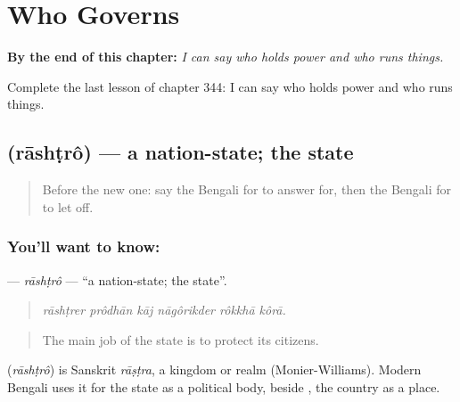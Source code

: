 
\chapter{Who Governs}
\label{ch:bn-who-governs}

\begin{chapteropening}
\textbf{By the end of this chapter:} \emph{I can say who holds power and who runs things.}

Complete the last lesson of chapter 344: I can say who holds power and who runs things.
\end{chapteropening}

\section[\texorpdfstring{\bn{রাষ্ট্র} (rāshṭrô)}{রাষ্ট্র (rāshṭrô)}]{ (rāshṭrô) — a nation-state; the state}

\label{lesson:BN-C344-rashtro}



\begin{quote}
Before the new one: say the Bengali for to answer for, then the Bengali for to let off.
\end{quote}

\subsection*{You'll want to know: }
\textbf{} — \emph{rāshṭrô} — \textquotedblleft{}a nation-state; the state\textquotedblright{}.

\begin{quote}
     
\end{quote}

\begin{quote}
\emph{rāshṭrer prôdhān kāj nāgôrikder rôkkhā kôrā.}
\end{quote}

\begin{quote}
The main job of the state is to protect its citizens.
\end{quote}

\begin{cousinweb}
\textbf{} (\emph{rāshṭrô}) is Sanskrit \emph{rāṣṭra}, a kingdom or realm (Monier-Williams). Modern Bengali uses it for the state as a political body, beside , the country as a place.
\end{cousinweb}

